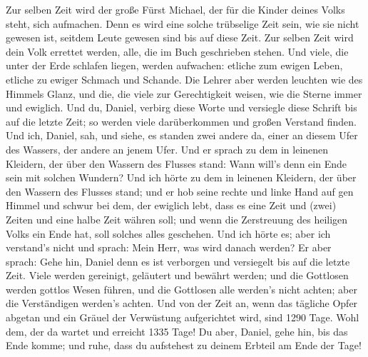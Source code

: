  Zur selben Zeit wird der große Fürst Michael, der für die
Kinder deines Volks steht, sich aufmachen. Denn es wird eine solche
trübselige Zeit sein, wie sie nicht gewesen ist, seitdem Leute gewesen
sind bis auf diese Zeit. Zur selben Zeit wird dein Volk errettet werden,
alle, die im Buch geschrieben stehen.  Und viele, die
unter der Erde schlafen liegen, werden aufwachen: etliche zum ewigen
Leben, etliche zu ewiger Schmach und Schande.  Die Lehrer
aber werden leuchten wie des Himmels Glanz, und die, die viele zur
Gerechtigkeit weisen, wie die Sterne immer und ewiglich. 
Und du, Daniel, verbirg diese Worte und versiegle diese Schrift bis auf
die letzte Zeit; so werden viele darüberkommen und großen Verstand
finden.  Und ich, Daniel, sah, und siehe, es standen zwei
andere da, einer an diesem Ufer des Wassers, der andere an jenem Ufer.
 Und er sprach zu dem in leinenen Kleidern, der über den
Wassern des Flusses stand: Wann will's denn ein Ende sein mit solchen
Wundern?  Und ich hörte zu dem in leinenen Kleidern, der
über den Wassern des Flusses stand; und er hob seine rechte und linke
Hand auf gen Himmel und schwur bei dem, der ewiglich lebt, dass es eine
Zeit und (zwei) Zeiten und eine halbe Zeit währen soll; und wenn die
Zerstreuung des heiligen Volks ein Ende hat, soll solches alles
geschehen.  Und ich hörte es; aber ich verstand's nicht
und sprach: Mein Herr, was wird danach werden?  Er aber
sprach: Gehe hin, Daniel denn es ist verborgen und versiegelt bis auf
die letzte Zeit.  Viele werden gereinigt, geläutert und
bewährt werden; und die Gottlosen werden gottlos Wesen führen, und die
Gottlosen alle werden's nicht achten; aber die Verständigen werden's
achten.  Und von der Zeit an, wenn das tägliche Opfer
abgetan und ein Gräuel der Verwüstung aufgerichtet wird, sind 1290 Tage.
 Wohl dem, der da wartet und erreicht 1335 Tage!
 Du aber, Daniel, gehe hin, bis das Ende komme; und ruhe,
dass du aufstehest zu deinem Erbteil am Ende der Tage!
